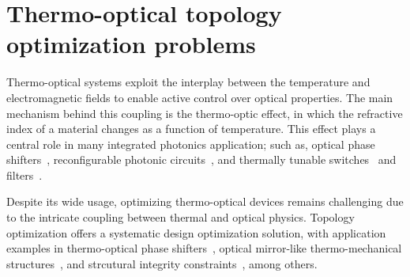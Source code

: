 \chapter{Thermo-optical topology optimization problems}
Thermo-optical systems exploit the interplay between the temperature and electromagnetic fields to enable active control over optical properties. 
The main mechanism behind this coupling is the thermo-optic effect, 
in which the refractive index of a material changes as a function of temperature. 
This effect plays a central role in many integrated photonics application; such as,
 optical phase shifters~\cite{TOPS_1, TOPS_2, TOPS_3}, reconfigurable photonic circuits~\cite{program, PIC}, and thermally tunable switches~\cite{switch, switch_2} and filters~\cite{filter}.

 Despite its wide usage, optimizing thermo-optical devices remains challenging due to the intricate coupling 
 between thermal and optical physics. Topology optimization offers a systematic design optimization solution, with application examples in
  thermo-optical phase shifters~\cite{TOPS_heat, ownpub0}, optical mirror-like thermo-mechanical structures~\cite{opt_perf}, and
strcutural integrity constraints~\cite{structural_heat}, among others.


